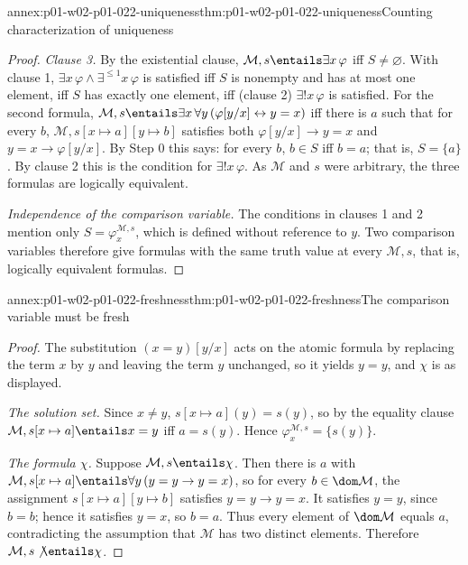 \begin{annexitem}{annex:p01-w02-p01-022-uniqueness}{thm:p01-w02-p01-022-uniqueness}{Counting characterization of uniqueness}
\begin{proof}
\emph{Clause 3.} By the existential clause,
\(\mathcal M,s\entails\exists x\,\varphi\) iff \(S\ne\varnothing\). With
clause 1, \(\exists x\,\varphi\land\exists^{\leq1}x\,\varphi\) is satisfied
iff \(S\) is nonempty and has at most one element, iff \(S\) has exactly
one element, iff (clause 2) \(\exists!x\,\varphi\) is satisfied. For the
second formula, \(\mathcal M,s\entails\exists x\,\forall y\,
(\varphi[y/x]\leftrightarrow y=x)\) iff there is \(a\) such that for every
\(b\), \(\mathcal M,s[x\mapsto a][y\mapsto b]\) satisfies both
\(\varphi[y/x]\to y=x\) and \(y=x\to\varphi[y/x]\). By Step 0 this says:
for every \(b\), \(b\in S\) iff \(b=a\); that is, \(S=\{a\}\). By clause 2
this is the condition for \(\exists!x\,\varphi\). As \(\mathcal M\) and \(s\)
were arbitrary, the three formulas are logically equivalent.

\emph{Independence of the comparison variable.} The conditions in clauses 1
and 2 mention only \(S=\varphi^{\mathcal M,s}_x\), which is defined without
reference to \(y\). Two comparison variables therefore give formulas with
the same truth value at every \(\mathcal M,s\), that is, logically
equivalent formulas.
\end{proof}
\end{annexitem}

\begin{annexitem}{annex:p01-w02-p01-022-freshness}{thm:p01-w02-p01-022-freshness}{The comparison variable must be fresh}
\begin{proof}
The substitution \((x=y)[y/x]\) acts on the atomic formula by replacing the
term \(x\) by \(y\) and leaving the term \(y\) unchanged, so it yields
\(y=y\), and \(\chi\) is as displayed.

\emph{The solution set.} Since \(x\ne y\), \(s[x\mapsto a](y)=s(y)\), so by
the equality clause \(\mathcal M,s[x\mapsto a]\entails x=y\) iff
\(a=s(y)\). Hence \(\varphi^{\mathcal M,s}_x=\{s(y)\}\).

\emph{The formula \(\chi\).} Suppose \(\mathcal M,s\entails\chi\). Then there
is \(a\) with \(\mathcal M,s[x\mapsto a]\entails\forall y\,(y=y\to y=x)\),
so for every \(b\in\dom\mathcal M\), the assignment
\(s[x\mapsto a][y\mapsto b]\) satisfies \(y=y\to y=x\). It satisfies
\(y=y\), since \(b=b\); hence it satisfies \(y=x\), so \(b=a\). Thus every
element of \(\dom\mathcal M\) equals \(a\), contradicting the assumption that
\(\mathcal M\) has two distinct elements. Therefore
\(\mathcal M,s\not\entails\chi\).
\end{proof}
\end{annexitem}

